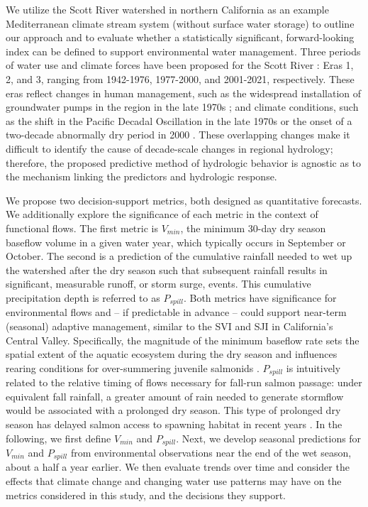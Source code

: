 \documentclass[hess, manuscript]{copernicus}
\begin{document}
We utilize the Scott River watershed in northern California as an
example Mediterranean climate stream system (without surface water
storage) to outline our approach and to evaluate whether a statistically
significant, forward-looking index can be defined to support
environmental water management. Three periods of water use and climate
forces have been proposed for the Scott River \citep[e.g.,
by][]{Pyschik2022}: Eras 1, 2, and 3, ranging from 1942-1976, 1977-2000,
and 2001-2021, respectively. These eras reflect changes in human
management, such as the widespread installation of groundwater pumps in
the region in the late 1970s \citep{Tolley2019}; and climate conditions,
such as the shift in the Pacific Decadal Oscillation in the late 1970s
\citep{Francis1998} or the onset of a two-decade abnormally dry period
in 2000 \citep{Williams2020}. These overlapping changes make it
difficult to identify the cause of decade-scale changes in regional
hydrology; therefore, the proposed predictive method of hydrologic
behavior is agnostic as to the mechanism linking the predictors and
hydrologic response.

We propose two decision-support metrics, both designed as quantitative
forecasts. We additionally explore the significance of each metric in
the context of functional flows. The first metric is $V_{min}$, the
minimum 30-day dry season baseflow volume in a given water year, which
typically occurs in September or October. The second is a prediction of
the cumulative rainfall needed to wet up the watershed after the dry
season such that subsequent rainfall results in significant, measurable
runoff, or storm surge, events. This cumulative precipitation depth is
referred to as $P_{spill}$. Both metrics have significance for
environmental flows and -- if predictable in advance -- could support
near-term (seasonal) adaptive management, similar to the SVI and SJI in
California's Central Valley. Specifically, the magnitude of the minimum
baseflow rate sets the spatial extent of the aquatic ecosystem during
the dry season and influences rearing conditions for over-summering
juvenile salmonids \citep{Gorman2016}. $P_{spill}$ is intuitively
related to the relative timing of flows necessary for fall-run salmon
passage: under equivalent fall rainfall, a greater amount of rain needed
to generate stormflow would be associated with a prolonged dry season.
This type of prolonged dry season has delayed salmon access to spawning
habitat in recent years \citep{CDFW2015a}. In the
following, we first define $V_{min}$ and $P_{spill}$. Next, we
develop seasonal predictions for $V_{min}$ and $P_{spill}$ from
environmental observations near the end of the wet season, about a half
a year earlier. We then evaluate trends over time and consider the
effects that climate change and changing water use patterns may have on
the metrics considered in this study, and the decisions they support.
\end{document}
